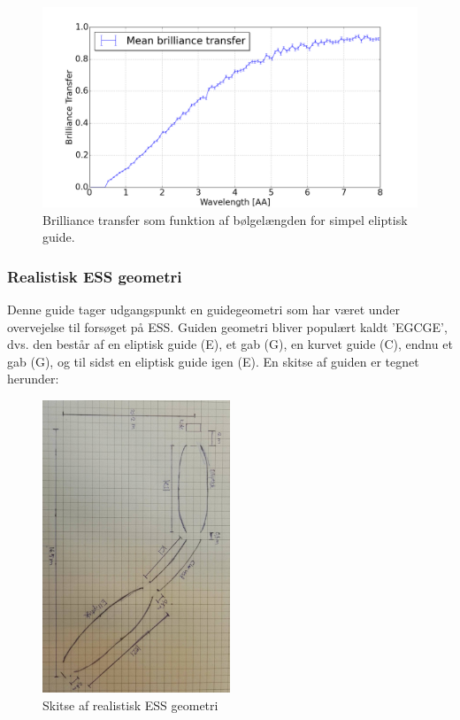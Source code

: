\documentclass[12pt,oneside,a4paper]{article}
\begin{document}
{{{{{\begin{figure}[H]
\centering
\includegraphics[width=1\textwidth]{optimized_mean_4.png}
\caption{Brilliance transfer som funktion af bølgelængden for simpel eliptisk guide.}
\end{figure}




\subsubsection{Realistisk ESS geometri}
Denne guide tager udgangspunkt en guidegeometri som har været under overvejelse til forsøget på ESS. Guiden geometri bliver populært kaldt 'EGCGE', dvs. den består af en eliptisk guide (E), et gab (G), en kurvet guide (C), endnu et gab (G), og til sidst en eliptisk guide igen (E). En skitse af guiden er tegnet herunder:

\begin{figure}[H]
\centering
\includegraphics[width=0.5\textwidth, angle=90]{EGCGE.JPG}
\caption{Skitse af realistisk ESS geometri}
\end{figure}

}}}}}
\end{document}
